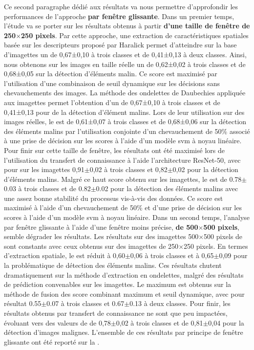 Ce second paragraphe dédié aux résultats va nous permettre d'approfondir les performances de l'approche \textbf{par fenêtre glissante}. Dans un premier temps, l'étude va se porter sur les résultats obtenus à partir\textbf{ d'une taille de fenêtre de 250$\times$250 pixels}. Par cette approche, une extraction de caractéristiques spatiales basée sur les descripteurs proposé par Haralick permet d'atteindre sur la base d'imagettes un \fscore de 0,67±0,10 à trois classes et de 0,41±0,13 à deux classes. Ainsi, nous obtenons sur les images en taille réelle un \fscore de 0,62±0,02 à trois classes et de 0,68±0,05 sur la détection d'éléments malin. Ce score est maximisé par l'utilisation d'une combinaison de seuil dynamique sur les décisions sans chevauchements des images. La méthode des ondelettes de Daubechies appliquée aux imagettes permet l'obtention d'un \fscore de 0,67±0,10 à trois classes et de 0,41±0,13 pour de la détection d'élément malins. Lors de leur utilisation sur des images réelles, le \fscore est de 0,61±0,07 à trois classes et de 0,68±0,06 sur la détection des éléments malins par l'utilisation conjointe d'un chevauchement de 50\% associé à une prise de décision sur les scores à l'aide d'un modèle \gls{svm} à noyau linéaire. Pour finir sur cette taille de fenêtre, les résultats ont été maximisé lors de l'utilisation du transfert de connaissance à l'aide l'architecture ResNet-50, avec pour \fscore sur les imagettes 0,91$\pm$0,02 à trois classes et 0,82$\pm$0,02 pour la détection d'éléments malins. Malgré ce haut score obtenu sur les imagettes, le \fscore est de 0.78$\pm$0.03 à trois classes et de 0.82$\pm$0.02 pour la détection des éléments malins avec une assez bonne stabilité du processus vis-à-vis des données. Ce score est maximisé à l'aide d'un chevauchement de 50\% et d'une prise de décision sur les scores à l'aide d'un modèle \gls{svm} à noyau linéaire. Dans un second temps, l'analyse par fenêtre glissante à l'aide d'une fenêtre moins précise, \textbf{de 500$\times$500 pixels}, semble dégrader les résultats. Les résultats sur des imagettes 500$\times$500 pixels de sont constants avec ceux obtenus sur des imagettes de 250$\times$250 pixels. En termes d'extraction spatiale, le \fscore est réduit à 0,60$\pm$0,06 à trois classes et à 0,65$\pm$0,09 pour la problématique de détection des éléments malins. Ces résultats chutent dramatiquement sur la méthode d'extraction en ondelettes, malgré des résultats de prédiction convenables sur les imagettes. Le \fscore maximum est obtenus sur la méthode de fusion des score combinant maximum et seuil dynamique, avec pour résultat 0.55$\pm$0.07 à trois classes et 0.67$\pm$0.13 à deux classes. Pour finir, les résultats obtenus par transfert de connaissance ne sont que peu impactées, évoluant vers des valeurs de \fscore de 0,78$\pm$0,02 à trois classes et de 0,81$\pm$0,04 pour la détection d'images malignes. L'ensemble de ces résultats par principe de fenêtre glissante ont été reporté sur la .\par

